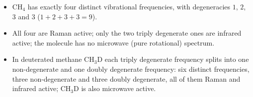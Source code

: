 \begin{keyresult}
\begin{itemize}
\item $\mathrm{CH_4}$ has exactly four distinct vibrational frequencies,
      with degeneracies $1$, $2$, $3$ and $3$ ($1+2+3+3=9$).
\item All four are Raman active; only the two triply degenerate ones are infrared
      active; the molecule has no microwave (pure rotational) spectrum.
\item In deuterated methane $\mathrm{CH_3D}$ each triply degenerate frequency splits
      into one non-degenerate and one doubly degenerate frequency: six distinct
      frequencies, three non-degenerate and three doubly degenerate, all of them
      Raman and infrared active; $\mathrm{CH_3D}$ is also microwave active.
\end{itemize}
\end{keyresult}

